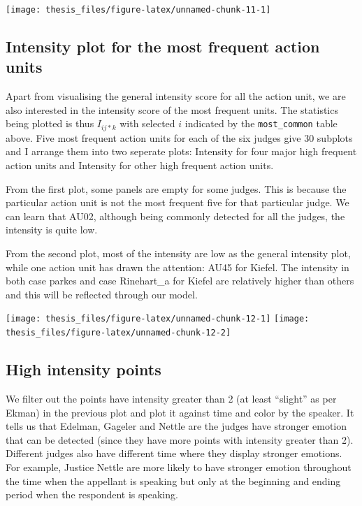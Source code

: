 \documentclass{monashthesis}
\begin{document}
\texttt{[image: thesis\_files/figure-latex/unnamed-chunk-11-1]}

\hypertarget{intensity-plot-for-the-most-frequent-action-units}{%
\subsection{Intensity plot for the most frequent action units}\label{intensity-plot-for-the-most-frequent-action-units}}

Apart from visualising the general intensity score for all the action unit, we are also interested in the intensity score of the most frequent units. The statistics being plotted is thus \(I_{ij*k}\) with selected \(i\) indicated by the \texttt{most\_common} table above. Five most frequent action units for each of the six judges give 30 subplots and I arrange them into two seperate plots: Intensity for four major high frequent action units and Intensity for other high frequent action units.

From the first plot, some panels are empty for some judges. This is because the particular action unit is not the most frequent five for that particular judge. We can learn that AU02, although being commonly detected for all the judges, the intensity is quite low.

From the second plot, most of the intensity are low as the general intensity plot, while one action unit has drawn the attention: AU45 for Kiefel. The intensity in both case parkes and case Rinehart\_a for Kiefel are relatively higher than others and this will be reflected through our model.

\texttt{[image: thesis\_files/figure-latex/unnamed-chunk-12-1]}
\texttt{[image: thesis\_files/figure-latex/unnamed-chunk-12-2]}

\hypertarget{high-intensity-points}{%
\subsection{High intensity points}\label{high-intensity-points}}

We filter out the points have intensity greater than 2 (at least ``slight'' as per Ekman) in the previous plot and plot it against time and color by the speaker. It tells us that Edelman, Gageler and Nettle are the judges have stronger emotion that can be detected (since they have more points with intensity greater than 2). Different judges also have different time where they display stronger emotions. For example, Justice Nettle are more likely to have stronger emotion throughout the time when the appellant is speaking but only at the beginning and ending period when the respondent is speaking.
\end{document}

